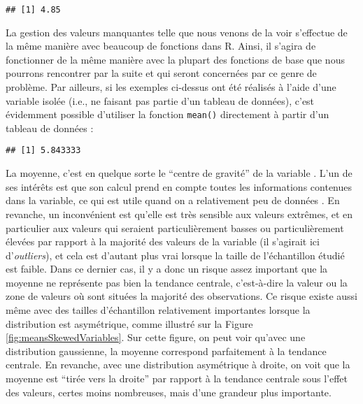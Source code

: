 \documentclass[
]{book}
\newenvironment{Shaded}{\begin{snugshade}}{\end{snugshade}}
\newcommand{\AttributeTok}[1]{\textcolor[rgb]{0.77,0.63,0.00}{#1}}
\newcommand{\FunctionTok}[1]{\textcolor[rgb]{0.00,0.00,0.00}{#1}}
\newcommand{\NormalTok}[1]{#1}
\newcommand{\SpecialCharTok}[1]{\textcolor[rgb]{0.00,0.00,0.00}{#1}}
\begin{document}
\begin{verbatim}
## [1] 4.85
\end{verbatim}

La gestion des valeurs manquantes telle que nous venons de la voir s'effectue de la même manière avec beaucoup de fonctions dans R. Ainsi, il s'agira de fonctionner de la même manière avec la plupart des fonctions de base que nous pourrons rencontrer par la suite et qui seront concernées par ce genre de problème. Par ailleurs, si les exemples ci-dessus ont été réalisés à l'aide d'une variable isolée (i.e., ne faisant pas partie d'un tableau de données), c'est évidemment possible d'utiliser la fonction \texttt{mean()} directement à partir d'un tableau de données :

\begin{Shaded}
\end{Shaded}

\begin{verbatim}
## [1] 5.843333
\end{verbatim}

La moyenne, c'est en quelque sorte le ``centre de gravité'' de la variable \autocite{navarroLearningStatistics2018}. L'un de ses intérêts est que son calcul prend en compte toutes les informations contenues dans la variable, ce qui est utile quand on a relativement peu de données \autocite{navarroLearningStatistics2018}. En revanche, un inconvénient est qu'elle est très sensible aux valeurs extrêmes, et en particulier aux valeurs qui seraient particulièrement basses ou particulièrement élevées par rapport à la majorité des valeurs de la variable (il s'agirait ici d'\emph{outliers}), et cela est d'autant plus vrai lorsque la taille de l'échantillon étudié est faible. Dans ce dernier cas, il y a donc un risque assez important que la moyenne ne représente pas bien la tendance centrale, c'est-à-dire la valeur ou la zone de valeurs où sont situées la majorité des observations. Ce risque existe aussi même avec des tailles d'échantillon relativement importantes lorsque la distribution est asymétrique, comme illustré sur la Figure \ref{fig:meansSkewedVariables}. Sur cette figure, on peut voir qu'avec une distribution gaussienne, la moyenne correspond parfaitement à la tendance centrale. En revanche, avec une distribution asymétrique à droite, on voit que la moyenne est ``tirée vers la droite'' par rapport à la tendance centrale sous l'effet des valeurs, certes moins nombreuses, mais d'une grandeur plus importante.
\end{document}

